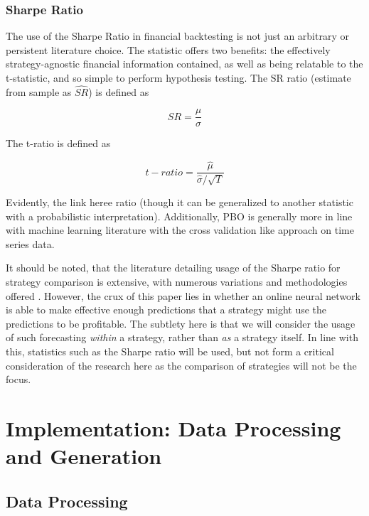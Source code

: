 \documentclass[a4paper,11pt,oneside]{article}
\theoremstyle{plain}
\theoremstyle{definition}
\begin{document}
\subsubsection {Sharpe Ratio}

The use of the Sharpe Ratio in financial backtesting is not just an arbitrary or persistent literature choice. 
The statistic offers two benefits: the effectively strategy-agnostic financial information contained, as well as being 
relatable to the t-statistic, and so simple to perform hypothesis testing. The SR ratio (estimate from sample as $\hat{SR}$) 
is defined as

\begin{equation}\label{SR}
  SR=\frac{\mu}{\sigma}
\end{equation}

The t-ratio is defined as 

\begin{equation}\label{tratio}
  t-ratio = \frac{\hat{\mu}}{\hat{\sigma}/\sqrt{T}}
\end{equation}

Evidently, the link heree ratio (though it can be generalized to another statistic with a probabilistic interpretation). Additionally, 
PBO is generally more in line with machine learning literature with the cross validation like approach on time series data.  
\hfill \break 

It should be noted, that the literature detailing usage of the Sharpe ratio for strategy comparison is extensive, with 
numerous variations and methodologies offered \cite{BaileySharpe}. However, the crux of this paper lies 
in whether an online neural network is able to make effective enough predictions that a strategy might use the 
predictions to be profitable. The subtlety here is that we will consider the usage of such forecasting \textit{within} a strategy,
 rather than \textit{as} a strategy itself. In line with this, statistics such as the Sharpe ratio will be used, but not form a critical 
 consideration of the research here as the comparison of strategies will not be the focus.
\hfill \break 

\newpage


\section{Implementation: Data Processing and Generation }\label{Data}
\subsection{Data Processing}\label{data_processing}
\end{document}
